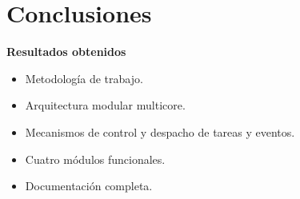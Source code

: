\documentclass[11pt, xcolor={table,xcdraw}]{beamer}
\begin{document}
\section{Conclusiones}

\begin{frame}{\textbf{\LARGE{Resultados obtenidos}}}
\fontsize{18pt}{18}\selectfont
	\vspace{-.7cm}
	\centering
	\begin{itemize}
  \item Metodología de trabajo.
	\vspace{15px}
	\item Arquitectura modular multicore.
	\vspace{15px}
	\item Mecanismos de control y despacho de tareas y eventos.
	\vspace{15px}
	\item Cuatro módulos funcionales.
	\vspace{15px}	
	\item Documentación completa.
	\end{itemize}
\end{frame}
\end{document}
